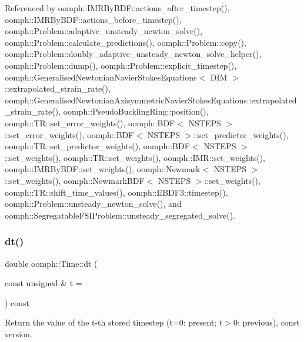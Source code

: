 Referenced by oomph\+::\+I\+M\+R\+By\+B\+D\+F\+::actions\+\_\+after\+\_\+timestep(), oomph\+::\+I\+M\+R\+By\+B\+D\+F\+::actions\+\_\+before\+\_\+timestep(), oomph\+::\+Problem\+::adaptive\+\_\+unsteady\+\_\+newton\+\_\+solve(), oomph\+::\+Problem\+::calculate\+\_\+predictions(), oomph\+::\+Problem\+::copy(), oomph\+::\+Problem\+::doubly\+\_\+adaptive\+\_\+unsteady\+\_\+newton\+\_\+solve\+\_\+helper(), oomph\+::\+Problem\+::dump(), oomph\+::\+Problem\+::explicit\+\_\+timestep(), oomph\+::\+Generalised\+Newtonian\+Navier\+Stokes\+Equations$<$ D\+I\+M $>$\+::extrapolated\+\_\+strain\+\_\+rate(), oomph\+::\+Generalised\+Newtonian\+Axisymmetric\+Navier\+Stokes\+Equations\+::extrapolated\+\_\+strain\+\_\+rate(), oomph\+::\+Pseudo\+Buckling\+Ring\+::position(), oomph\+::\+T\+R\+::set\+\_\+error\+\_\+weights(), oomph\+::\+B\+D\+F$<$ N\+S\+T\+E\+P\+S $>$\+::set\+\_\+error\+\_\+weights(), oomph\+::\+B\+D\+F$<$ N\+S\+T\+E\+P\+S $>$\+::set\+\_\+predictor\+\_\+weights(), oomph\+::\+T\+R\+::set\+\_\+predictor\+\_\+weights(), oomph\+::\+B\+D\+F$<$ N\+S\+T\+E\+P\+S $>$\+::set\+\_\+weights(), oomph\+::\+T\+R\+::set\+\_\+weights(), oomph\+::\+I\+M\+R\+::set\+\_\+weights(), oomph\+::\+I\+M\+R\+By\+B\+D\+F\+::set\+\_\+weights(), oomph\+::\+Newmark$<$ N\+S\+T\+E\+P\+S $>$\+::set\+\_\+weights(), oomph\+::\+Newmark\+B\+D\+F$<$ N\+S\+T\+E\+P\+S $>$\+::set\+\_\+weights(), oomph\+::\+T\+R\+::shift\+\_\+time\+\_\+values(), oomph\+::\+E\+B\+D\+F3\+::timestep(), oomph\+::\+Problem\+::unsteady\+\_\+newton\+\_\+solve(), and oomph\+::\+Segregatable\+F\+S\+I\+Problem\+::unsteady\+\_\+segregated\+\_\+solve().

\mbox{\label{classoomph_1_1Time_a4e956b0a5d0ef62ec7be904e66b33133}} 
\subsubsection{\texorpdfstring{dt()}{dt()}\hspace{0.1cm}{\footnotesize\ttfamily [2/2]}}
{\footnotesize\ttfamily double oomph\+::\+Time\+::dt (\begin{DoxyParamCaption}\item[{const unsigned \&}]{t = {} }\end{DoxyParamCaption}) const\hspace{0.3cm}{\ttfamily [inline]}}

Return the value of the t-\/th stored timestep (t=0\+: present; t$>$0\+: previous), const version. 

